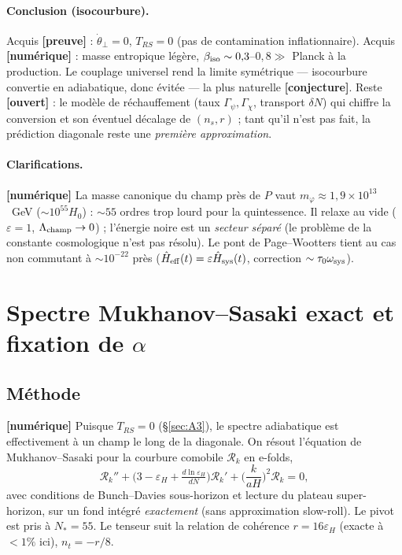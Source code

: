 \documentclass[11pt,a4paper]{article}
\newcommand{\st}[1]{\textbf{\textcolor{blue!45!black}{[#1]}}}
\begin{document}
\paragraph{Conclusion (isocourbure).} Acquis \st{preuve} : $\dot\theta_\perp=0$, $T_{RS}=0$ (pas de contamination inflationnaire). Acquis \st{numérique} : masse entropique légère, $\beta_{\rm iso}\sim0{,}3$–$0{,}8\gg$ Planck à la production. Le couplage universel rend la limite symétrique --- isocourbure convertie en adiabatique, donc évitée --- la plus naturelle \st{conjecture}. Reste \st{ouvert} : le modèle de réchauffement (taux $\Gamma_\psi,\Gamma_\chi$, transport $\delta N$) qui chiffre la conversion et son éventuel décalage de $(n_s,r)$ ; tant qu'il n'est pas fait, la prédiction diagonale reste une \emph{première approximation}.

\paragraph{Clarifications.}
\st{numérique} La masse canonique du champ près de $P$ vaut $m_\varphi\approx1{,}9\times10^{13}$~GeV ($\sim10^{55}H_0$) : $\sim55$ ordres trop lourd pour la quintessence. Il relaxe au vide ($\varepsilon=1$, $\Lambda_{\rm champ}\to0$) ; l'énergie noire est un \emph{secteur séparé} (le problème de la constante cosmologique n'est pas résolu). Le pont de Page–Wootters tient au cas non commutant à $\sim10^{-22}$ près ($\hat H_{\rm eff}(t)=\varepsilon\hat H_{\rm sys}(t)$, correction $\sim\tau_0\omega_{\rm sys}$).

\section{Spectre Mukhanov–Sasaki exact et fixation de $\alpha$}\label{sec:A4}

\subsection{Méthode}
\st{numérique} Puisque $T_{RS}=0$ (\S\ref{sec:A3}), le spectre adiabatique est effectivement à un champ le long de la diagonale. On résout l'équation de Mukhanov–Sasaki pour la courbure comobile $\mathcal{R}_k$ en e-folds,
\begin{equation}
\mathcal{R}_k''+\big(3-\varepsilon_H+\tfrac{d\ln\varepsilon_H}{dN}\big)\mathcal{R}_k'+\Big(\frac{k}{aH}\Big)^2\mathcal{R}_k=0, \tag{9}
\end{equation}
avec conditions de Bunch–Davies sous-horizon et lecture du plateau super-horizon, sur un fond intégré \emph{exactement} (sans approximation slow-roll). Le pivot est pris à $N_*=55$. Le tenseur suit la relation de cohérence $r=16\varepsilon_H$ (exacte à $<1\%$ ici), $n_t=-r/8$.
\end{document}
